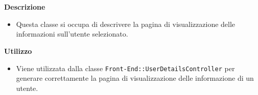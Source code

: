 				\textbf{\\ \\ Descrizione} 
					\begin{itemize}
						\item[] Questa classe si occupa di descrivere la pagina di visualizzazione delle informazioni sull'utente selezionato.
					\end{itemize}      
				\textbf{Utilizzo}  
					\begin{itemize}
						\item[] Viene utilizzata dalla classe \texttt{Front-End::UserDetailsController} per generare correttamente la pagina di visualizzazione delle informazione di un utente.
					\end{itemize}